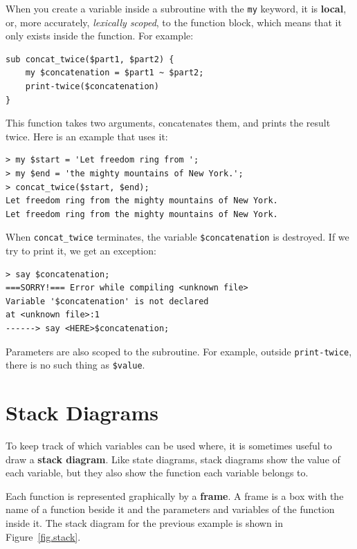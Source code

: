 When you create a variable inside a subroutine with the 
{\tt my} keyword, it is {\bf local}, or, more accurately, 
\emph{lexically scoped}, to the function block, which means 
that it only exists inside the function.  For example:

\begin{verbatim}
sub concat_twice($part1, $part2) {
    my $concatenation = $part1 ~ $part2;
    print-twice($concatenation)
}
\end{verbatim}
%
This function takes two arguments, concatenates them, and prints
the result twice.  Here is an example that uses it:

\begin{verbatim}
> my $start = 'Let freedom ring from ';
> my $end = 'the mighty mountains of New York.';
> concat_twice($start, $end);
Let freedom ring from the mighty mountains of New York.
Let freedom ring from the mighty mountains of New York.
\end{verbatim}
%
When \verb"concat_twice" terminates, the variable \verb"$concatenation" 
is destroyed.  If we try to print it, we get an exception:

\begin{verbatim}
> say $concatenation;
===SORRY!=== Error while compiling <unknown file>
Variable '$concatenation' is not declared
at <unknown file>:1
------> say <HERE>$concatenation;
\end{verbatim}
%
Parameters are also scoped to the subroutine.
For example, outside \verb"print-twice", there is no
such thing as \verb"$value".


\section{Stack Diagrams}
\label{stackdiagram}

To keep track of which variables can be used where, it is sometimes
useful to draw a {\bf stack diagram}.  Like state diagrams, stack
diagrams show the value of each variable, but they also show the
function each variable belongs to.

Each function is represented graphically by a {\bf frame}.  A frame 
is a box with the name of a function beside it and the parameters 
and variables of the function inside it.  The stack diagram for 
the previous example is shown in Figure~\ref{fig.stack}.

